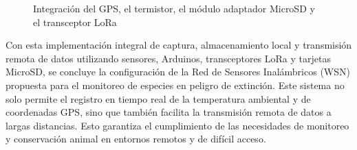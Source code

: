 \begin{itemize}
	\begin{figure}[H]
		\centering
		\quad
		\caption{ Integración del GPS, el termistor, el módulo adaptador MicroSD y el
			transceptor LoRa}
	\end{figure}
	
\end{itemize}


Con esta implementación integral de captura, almacenamiento local y transmisión remota de datos utilizando sensores, Arduinos, transceptores LoRa y tarjetas MicroSD, se concluye la configuración de la Red de Sensores Inalámbricos (WSN) propuesta para el monitoreo de especies en peligro de extinción. Este sistema no solo permite el registro en tiempo real de la temperatura ambiental y de coordenadas GPS, sino que también facilita la transmisión remota de datos a largas distancias. Esto garantiza el cumplimiento de las necesidades de monitoreo y conservación animal en entornos remotos y de difícil acceso.



\endinput 
